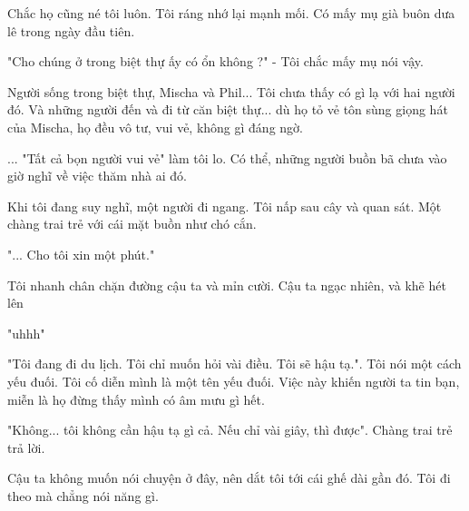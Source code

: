 Chắc họ cũng né tôi luôn. Tôi ráng nhớ lại mạnh mối. Có mấy mụ già buôn dưa lê trong ngày đầu tiên.

"Cho chúng ở trong biệt thự ấy có ổn không ?" - Tôi chắc mấy mụ nói vậy.

Người sống trong biệt thự, Mischa và Phil... Tôi chưa thấy có gì lạ với hai người đó. Và những người đến và đi từ căn biệt thự... dù họ tỏ vẻ tôn sùng giọng hát của Mischa, họ đều vô tư, vui vẻ, không gì đáng ngờ.

... "Tất cả bọn người vui vẻ" làm tôi lo. Có thể, những người buồn bã chưa vào giờ nghĩ về việc thăm nhà ai đó.

Khi tôi đang suy nghĩ, một người đi ngang. Tôi nấp sau cây và quan sát. Một chàng trai trẻ với cái mặt buồn như chó cắn.

"... Cho tôi xin một phút."

Tôi nhanh chân chặn đường cậu ta và mỉn cười. Cậu ta ngạc nhiên, và khẽ hét lên

"uhhh"

"Tôi đang đi du lịch. Tôi chỉ muốn hỏi vài điều. Tôi sẽ hậu tạ.". Tôi nói một cách yếu đuối. Tôi cố diễn mình là một tên yếu đuối. Việc này khiến người ta tin bạn, miễn là họ đừng thấy mình có âm mưu gì hết.

"Không... tôi không cần hậu tạ gì cả. Nếu chỉ vài giây, thì được". Chàng trai trẻ trả lời.

Cậu ta không muốn nói chuyện ở đây, nên dắt tôi tới cái ghế dài gần đó. Tôi đi theo mà chẳng nói năng gì. \\





